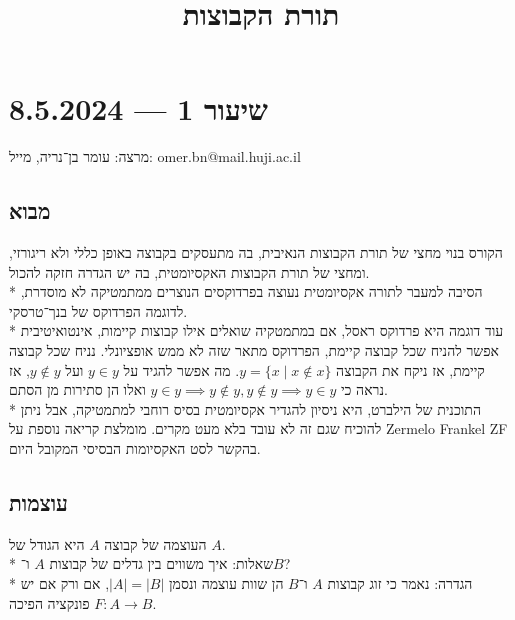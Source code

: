 
\usepackage{hyperref}
\hypersetup{}
\setcounter{secnumdepth}{2}
\title{תורת הקבוצות}


\maketitle
\maketitleprint{}

\tableofcontents

\section{שיעור 1 --- 8.5.2024}

מרצה: עומר בן־נריה, מייל: omer.bn@mail.huji.ac.il

\subsection{מבוא}
הקורס בנוי מחצי של תורת הקבוצות הנאיבית, בה מתעסקים בקבוצה באופן כללי ולא ריגורזי, ומחצי של תורת הקבוצות האקסיומטית, בה יש הגדרה חזקה להכול. \\*
הסיבה למעבר לתורה אקסיומטית נעוצה בפרדוקסים הנוצרים ממתמטיקה לא מוסדרת, לדוגמה הפרדוקס של בנך־טרסקי. \\*
עוד דוגמה היא פרדוקס ראסל, אם במתמטקיה שואלים אילו קבוצות קיימות, אינטואיטיבית אפשר להניח שכל קבוצה קיימת, הפרדוקס מתאר שזה לא ממש אופציונלי. נניח שכל קבוצה קיימת, אז ניקח את הקבוצה $y = \{x \mid x \not\in x\}$.
מה אפשר להגיד על $y \in y$ ועל $y \not\in y$, אז נראה כי $y \in y \implies y \not\in y, y\not\in y \implies y \in y$ ואלו הן סתירות מן הסתם. \\*
התוכנית של הילברט, היא ניסיון להגדיר אקסיומטית בסיס רוחבי למתמטיקה, אבל ניתן להוכיח שגם זה לא עובד בלא מעט מקרים.
מומלצת קריאה נוספת על Zermelo Frankel ZF בהקשר לסט האקסיומות הבסיסי המקובל היום.

\subsection{עוצמות}
העוצמה של קבוצה $A$ היא הגודל של $A$. \\*
שאלות: איך משווים בין גדלים של קבוצות $A$ ו־$B$? \\*
הגדרה: נאמר כי זוג קבוצות $A$ ו־$B$ הן שוות עוצמה ונסמן $|A| = |B|$, אם ורק אם יש פונקציה הפיכה $F: A \to B$.


